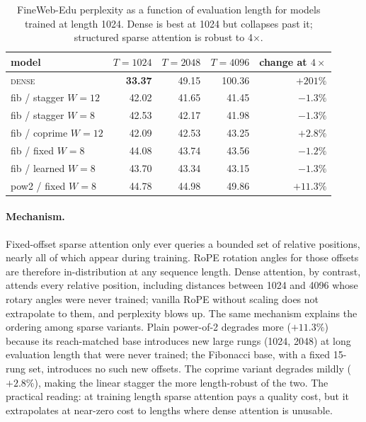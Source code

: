 \documentclass[11pt]{article}
\begin{document}
\begin{table}[htbp]
\centering
\small
\begin{tabular}{lrrrr}
\toprule
model & $T{=}1024$ & $T{=}2048$ & $T{=}4096$ & change at $4\times$ \\
\midrule
\textsc{dense}        & \textbf{33.37} & 49.15 & 100.36 & $+201\%$ \\
fib / stagger $W{=}12$ & 42.02 & 41.65 & 41.45 & $-1.3\%$ \\
fib / stagger $W{=}8$  & 42.53 & 42.17 & 41.98 & $-1.3\%$ \\
fib / coprime $W{=}12$ & 42.09 & 42.53 & 43.25 & $+2.8\%$ \\
fib / fixed $W{=}8$    & 44.08 & 43.74 & 43.56 & $-1.2\%$ \\
fib / learned $W{=}8$  & 43.70 & 43.34 & 43.15 & $-1.3\%$ \\
pow2 / fixed $W{=}8$   & 44.78 & 44.98 & 49.86 & $+11.3\%$ \\
\bottomrule
\end{tabular}
\caption{FineWeb-Edu perplexity as a function of evaluation length for
models trained at length 1024. Dense is best at 1024 but collapses past it;
structured sparse attention is robust to 4$\times$.}
\label{tab:extrap}
\end{table}

\paragraph{Mechanism.}
Fixed-offset sparse attention only ever queries a bounded set of relative
positions, nearly all of which appear during training. RoPE rotation angles for
those offsets are therefore in-distribution at any sequence length. Dense
attention, by contrast, attends every relative position, including distances
between 1024 and 4096 whose rotary angles were never trained; vanilla RoPE
without scaling does not extrapolate to them, and perplexity blows up. The same
mechanism explains the ordering among sparse variants. Plain power-of-2 degrades
more ($+11.3\%$) because its reach-matched base introduces new large rungs (1024,
2048) at long evaluation length that were never trained; the Fibonacci base, with
a fixed 15-rung set, introduces no such new offsets. The coprime variant degrades
mildly ($+2.8\%$), making the linear stagger the more length-robust of the two.
The practical reading: at training length sparse attention pays a quality cost,
but it extrapolates at near-zero cost to lengths where dense attention is
unusable.
\end{document}
